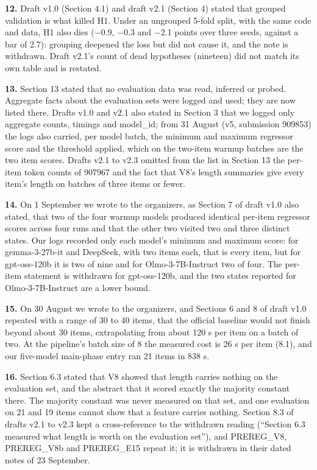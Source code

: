 \noindent\textbf{12.} Draft v1.0 (Section 4.1) and draft v2.1 (Section 4) stated that grouped validation is what killed H1. Under an ungrouped 5-fold split, with the same code and data, H1 also dies ($-$0.9, $-$0.3 and $-$2.1 points over three seeds, against a bar of 2.7): grouping deepened the loss but did not cause it, and the note is withdrawn. Draft v2.1's count of dead hypotheses (nineteen) did not match its own table and is restated.
\par

\noindent\textbf{13.} Section 13 stated that no evaluation data was read, inferred or probed. Aggregate facts about the evaluation sets were logged and used; they are now listed there. Drafts v1.0 and v2.1 also stated in Section 3 that we logged only aggregate counts, timings and model\_id; from 31 August (v5, submission 909853) the logs also carried, per model batch, the minimum and maximum regressor score and the threshold applied, which on the two-item warmup batches are the two item scores. Drafts v2.1 to v2.3 omitted from the list in Section 13 the per-item token counts of 907967 and the fact that V8's length summaries give every item's length on batches of three items or fewer.
\par

\noindent\textbf{14.} On 1 September we wrote to the organizers, as Section 7 of draft v1.0 also stated, that two of the four warmup models produced identical per-item regressor scores across four runs and that the other two visited two and three distinct states. Our logs recorded only each model's minimum and maximum score: for gemma-3-27b-it and DeepSeek, with two items each, that is every item, but for gpt-oss-120b it is two of nine and for Olmo-3-7B-Instruct two of four. The per-item statement is withdrawn for gpt-oss-120b, and the two states reported for Olmo-3-7B-Instruct are a lower bound.
\par

\noindent\textbf{15.} On 30 August we wrote to the organizers, and Sections 6 and 8 of draft v1.0 repeated with a range of 30 to 40 items, that the official baseline would not finish beyond about 30 items, extrapolating from about 120 s per item on a batch of two. At the pipeline's batch size of 8 the measured cost is 26 s per item (8.1), and our five-model main-phase entry ran 21 items in 838 s.
\par

\noindent\textbf{16.} Section 6.3 stated that V8 showed that length carries nothing on the evaluation set, and the abstract that it scored exactly the majority constant there. The majority constant was never measured on that set, and one evaluation on 21 and 19 items cannot show that a feature carries nothing. Section 8.3 of drafts v2.1 to v2.3 kept a cross-reference to the withdrawn reading (``Section 6.3 measured what length is worth on the evaluation set''), and PREREG\_V8, PREREG\_V8b and PREREG\_E15 repeat it; it is withdrawn in their dated notes of 23 September.
\par

